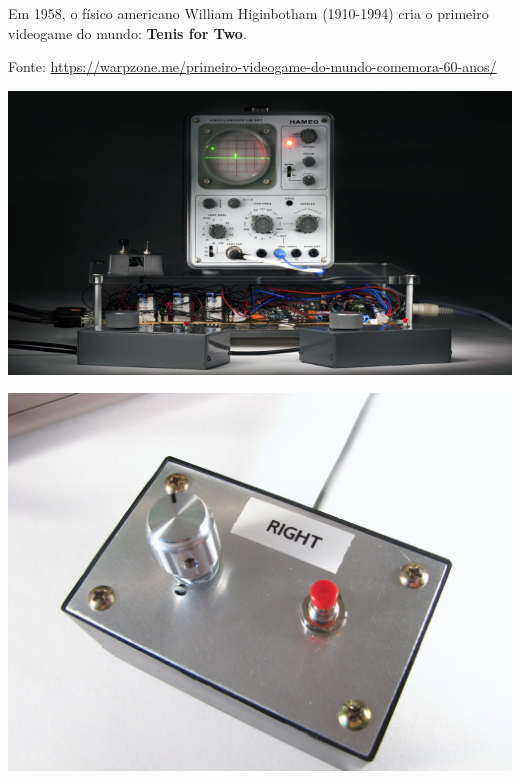 \begin{multicols}{2}
\large	
	Em 1958, o físico americano William Higinbotham (1910-1994) cria o primeiro videogame do mundo: \textbf{Tenis for Two}.
	
	\begin{flushright}
		\normalsize Fonte: \href{https://warpzone.me/primeiro-videogame-do-mundo-comemora-60-anos/}{https://warpzone.me/primeiro-videogame-do-mundo-comemora-60-anos/}
	\end{flushright}

\vfill\null
\columnbreak

	\begin{center}
		\includegraphics[width=\linewidth]{./IMG/tenis1-696x392.jpg}
	\end{center}

\vfill\null
\columnbreak

\begin{center}
	\includegraphics[width=\linewidth]{./IMG/tenis2.jpg}
\end{center}



\end{multicols}

